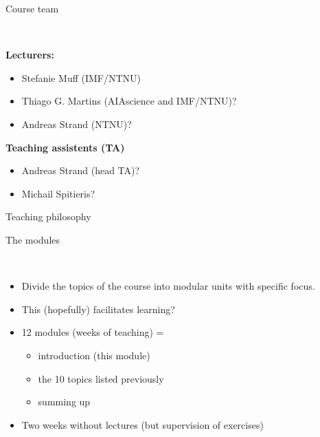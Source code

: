 \documentclass[ignorenonframetext,]{beamer}
\providecommand{\tightlist}{%
  \setlength{\itemsep}{0pt}\setlength{\parskip}{0pt}}
\begin{document}
\begin{frame}

\begin{block}{Course team}

~

\textbf{Lecturers:}

\begin{itemize}
\tightlist
\item
  Stefanie Muff (IMF/NTNU)
\item
  Thiago G. Martins (AIAscience and IMF/NTNU)?
\item
  Andreas Strand (NTNU)?
\end{itemize}

\textbf{Teaching assistents (TA)}

\begin{itemize}
\tightlist
\item
  Andreas Strand (head TA)?
\item
  Michail Spitieris?
\end{itemize}

\end{block}

\end{frame}

\begin{frame}{Teaching philosophy}

\begin{block}{The modules}

~

\begin{itemize}
\item
  Divide the topics of the course into modular units with specific
  focus.
\item
  This (hopefully) facilitates learning?
\item
  12 modules (weeks of teaching) =

  \begin{itemize}
  \tightlist
  \item
    introduction (this module)
  \item
    the 10 topics listed previously
  \item
    summing up\\
    \hspace*{0.333em}
  \end{itemize}
\item
  Two weeks without lectures (but supervision of exercises)
\end{itemize}

\end{block}

\end{frame}
\end{document}
